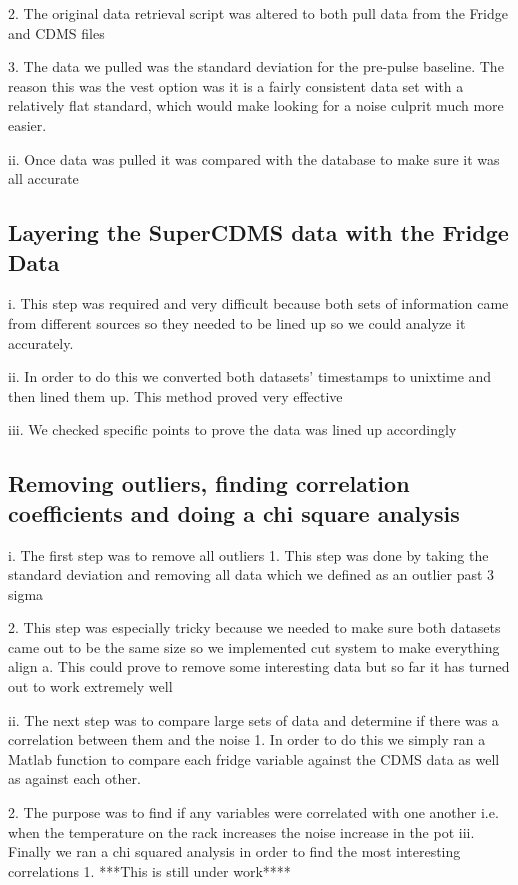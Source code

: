 2.	The original data retrieval script was altered to both pull data from the Fridge and CDMS files

3.	The data we pulled was the standard deviation for the pre-pulse baseline. The reason this was the vest option was it is a fairly consistent data set with a relatively flat standard, which would make looking for a noise culprit much more easier.

ii.	Once data was pulled it was compared with the database to make sure it was all accurate

\subsection{Layering the SuperCDMS data with the Fridge Data}
i.	This step was required and very difficult because both sets of information came from different sources so they needed to be lined up so we could analyze it accurately.

ii.	In order to do this we converted both datasets’ timestamps to unixtime and then lined them up. This method proved very effective

iii.	We checked specific points to prove the data was lined up accordingly

\subsection{Removing outliers, finding correlation coefficients and doing a chi square analysis}
i.	The first step was to remove all outliers
1.	This step was done by taking the standard deviation and removing all data which we defined as an outlier past 3 sigma

2.	This step was especially tricky because we needed to make sure both datasets came out to be the same size so we implemented cut system to make everything align
a.	This could prove to remove some interesting data but so far it has turned out to work extremely well

ii.	The next step was to compare large sets of data and determine if there was a correlation between them and the noise
1.	In order to do this we simply ran a Matlab function to compare each fridge variable against the CDMS data as well as against each other.

2.	The purpose was to find if any variables were correlated with one another i.e. when the temperature on the rack increases the noise increase in the pot
iii.	Finally we ran a chi squared analysis in order to find the most interesting correlations
1.	***This is still under work****
